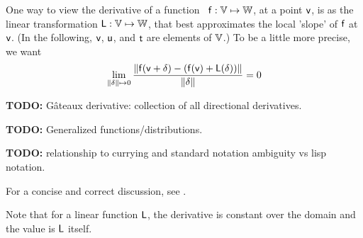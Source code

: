 \label{sec:Derivatives}

One way to view the derivative of a 
function~\cite{wiki:Frechet-derivative}
$\mathsf{f}:\mathbb{V} \mapsto \mathbb{W}$,
at a point $\mathsf{v}$,
is as the linear transformation $\mathsf{L}:\mathbb{V} \mapsto \mathbb{W}$,
that best approximates the local 'slope' of $\mathsf{f}$ at $\mathsf{v}$.
(In the following, $\mathsf{v}$, $\mathsf{u}$, and $\mathsf{t}$ are elements of $\mathbb{V}$.)
To be a little more precise, we want
\begin{equation}
\lim_{ \|{\bf \delta}  \| \mapsto 0}
\frac{ \| \mathsf{f}(\mathsf{v} + {\bf \delta}) - (\mathsf{f}(\mathsf{v}) + \mathsf{L}({\bf\delta})) \|}
{\|{\bf \delta}  \| }
 = 0
\end{equation}

\textbf{TODO:} G\^{a}teaux derivative: collection of all
directional derivatives.

\textbf{TODO:} Generalized functions/distributions.

\textbf{TODO:}
relationship to currying and standard notation ambiguity vs
lisp notation.

For a concise and correct discussion, 
see \cite[][chapter 2]{spivak-1965}.

Note that for a linear function $\mathsf{L}$,
the derivative is constant over the domain
and the value is $\mathsf{L}$ itself.

